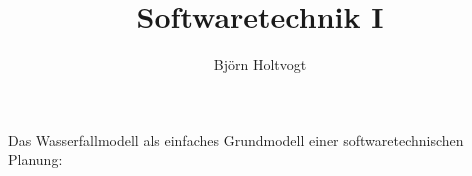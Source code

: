 



\begin{titlepage}
	
\title{Softwaretechnik I}
\author{Björn Holtvogt}
\date{}
\maketitle
\thispagestyle{empty} %
\begin{center}
Das Wasserfallmodell als einfaches Grundmodell einer softwaretechnischen Planung:
\end{center}

\end{titlepage}
	
\newpage
\pagestyle{empty}
\tableofcontents	
\newpage
\pagestyle{plain}
\setcounter{page}{1}


\newpage


\newpage


\newpage
	

\newpage


\newpage


\newpage

	
\newpage
	

\newpage

		
\newpage


	

